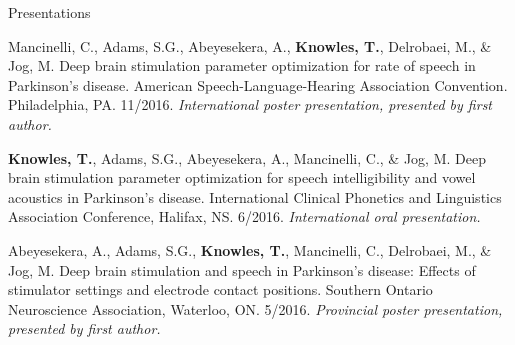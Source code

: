 \documentclass{resume} %
\begin{document}
\begin{rSection}{Presentations}
	
%	
%	
	
	Mancinelli, C., Adams, S.G., Abeyesekera, A., {\bf Knowles, T.}, Delrobaei, M., \& Jog, M. Deep brain stimulation parameter optimization for rate of speech in Parkinson's disease. American Speech-Language-Hearing Association Convention. Philadelphia, PA. 11/2016. \emph{International poster presentation, presented by first author.}
	
	{\bf Knowles, T.}, Adams, S.G., Abeyesekera, A., Mancinelli, C., \& Jog, M. Deep brain stimulation parameter optimization for speech intelligibility and vowel acoustics in Parkinson's disease. International Clinical Phonetics and Linguistics Association Conference, Halifax, NS. 6/2016. \emph{International oral presentation.}
	
	
	Abeyesekera, A., Adams, S.G., {\bf Knowles, T.}, Mancinelli, C., Delrobaei, M., \& Jog, M. Deep brain stimulation and speech in Parkinson's disease: Effects of stimulator settings and electrode contact positions. Southern Ontario Neuroscience Association, Waterloo, ON. 5/2016. \emph{Provincial poster presentation, presented by first author.}
	

\end{rSection}
\end{document}
